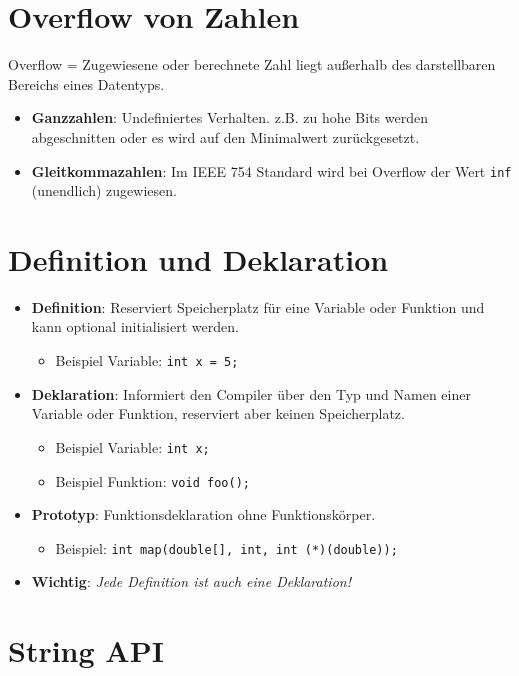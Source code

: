 \documentclass[10pt, a3paper, landscape]{article}
\newcommand{\algo}[1]{\textbf{\textcolor{blue!60!black}{#1}}}
\newcommand{\datastruct}[1]{\textbf{\textcolor{red!60!black}{#1}}}
\begin{document}
\begin{multicols*}{4}
\section{Overflow von Zahlen}
Overflow = Zugewiesene oder berechnete Zahl liegt außerhalb des darstellbaren Bereichs eines Datentyps.
\begin{itemize}
    \item \datastruct{Ganzzahlen}: Undefiniertes Verhalten. z.B. zu hohe Bits werden abgeschnitten oder es wird auf den Minimalwert zurückgesetzt.
    \item \datastruct{Gleitkommazahlen}: Im IEEE 754 Standard wird bei Overflow der Wert \texttt{inf} (unendlich) zugewiesen.
\end{itemize}

\section{Definition und Deklaration}
\begin{itemize}
    \item \algo{Definition}: Reserviert Speicherplatz für eine Variable oder Funktion und kann optional initialisiert werden.
    \begin{itemize}
        \item Beispiel Variable: \lstinline|int x = 5;|
    \end{itemize}
    \item \datastruct{Deklaration}: Informiert den Compiler über den Typ und Namen einer Variable oder Funktion, reserviert aber keinen Speicherplatz.
    \begin{itemize}
        \item Beispiel Variable: \lstinline|int x;|
        \item Beispiel Funktion: \lstinline|void foo();|
    \end{itemize}
    \item \datastruct{Prototyp}: Funktionsdeklaration ohne Funktionskörper.
    \begin{itemize}
        \item Beispiel: \lstinline|int map(double[], int, int (*)(double));|
    \end{itemize}
    \item \algo{Wichtig}: \textit{Jede Definition ist auch eine Deklaration!}
\end{itemize}

\section{String API}


\end{multicols*}
\end{document}
